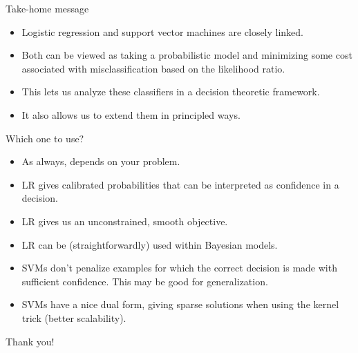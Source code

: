 \documentclass[12pt,notes,mathserif]{beamer}
\newcommand{\chuhao}{\fontsize{44.9pt}{\baselineskip}\selectfont}
\begin{document}
\begin{frame}{Take-home message}

\begin{itemize}
\item
  Logistic regression and support vector machines are closely linked.
\item
  Both can be viewed as taking a probabilistic model and minimizing some
  cost associated with misclassification based on the likelihood ratio.
\item
  This lets us analyze these classifiers in a decision theoretic
  framework.
\item
  It also allows us to extend them in principled ways.
\end{itemize}

\end{frame}

\begin{frame}{Which one to use?}

\begin{itemize}
\item
  As always, depends on your problem.
\item
  LR gives calibrated probabilities that can be interpreted as
  confidence in a decision.
\item
  LR gives us an unconstrained, smooth objective.
\item
  LR can be (straightforwardly) used within Bayesian models.
\item
  SVMs don't penalize examples for which the correct decision is made
  with sufficient confidence. This may be good for generalization.
\item
  SVMs have a nice dual form, giving sparse solutions when using the
  kernel trick (better scalability).
\end{itemize}

\end{frame}

\begin{frame}
	\begin{center}
		\chuhao Thank you!  
	\end{center}
\end{frame}
\end{document}
